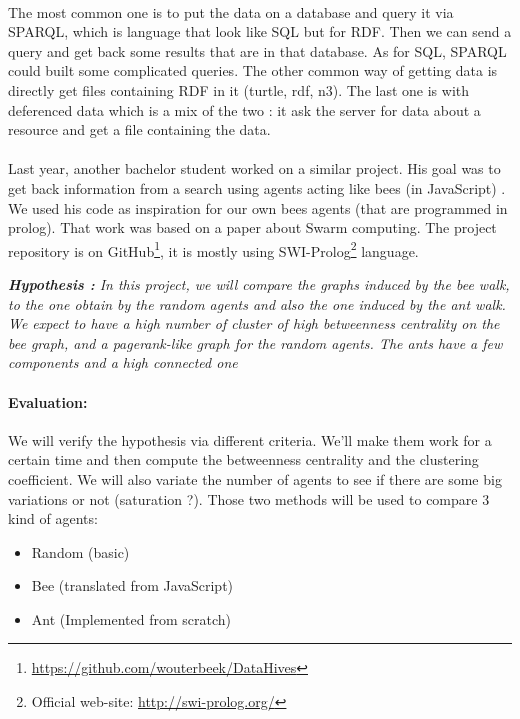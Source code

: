 \documentclass{article}
\newenvironment{itemh}[0]{\begin{itemize}[label=$\heartsuit$, font=\color{mygray} \small]}{\end{itemize}}
\begin{document}
	\paragraph{}	%
		The most common one is to put the data on a database and query it via SPARQL,
		which is language that look like SQL but for RDF.
		Then we can send a query and get back some results that are in that database.
		As for SQL, SPARQL could built some complicated queries.
		The other common way of getting data is directly get files containing RDF in it (turtle, rdf, n3).
		The last one is with deferenced data which is a mix of the two :
		it ask the server for data about a resource and get a file containing the data.
	\paragraph{}	%
		Last year, another bachelor student worked on a similar project.
		His goal was to get back information from a search using agents acting like bees (in JavaScript) \cite{Kroes13,Kroes13-2}.
		We used his code as inspiration for our own bees agents (that are programmed in prolog).
		That work was based on a paper \cite{Gueret10} about Swarm computing.
		The project repository is on GitHub\footnote{\url{https://github.com/wouterbeek/DataHives}},
		it is mostly using SWI-Prolog\footnote{Official web-site: \url{http://swi-prolog.org/}} language.
		\begin{center}
			\textit{
			\textbf{Hypothesis :} In this project, we will compare the graphs induced by the bee walk,
				to the one obtain by the random agents and also the one induced by the ant walk.
				We expect to have a high number of cluster of high betweenness centrality on the bee graph,
				and a pagerank-like graph for the random agents.
				The ants have a few components and a high connected one}
		\end{center}

		\paragraph{Evaluation:}
			We will verify the hypothesis via different criteria.
			We'll make them work for a certain time and then compute the betweenness centrality and the clustering coefficient.
			We will also variate the number of agents to see if there are some big variations or not (saturation ?).
			Those two methods will be used to compare 3 kind of agents:
		\begin{itemh}
			\item Random (basic)
			\item Bee (translated from JavaScript)
			\item Ant (Implemented from scratch)
		\end{itemh}
\end{document}
